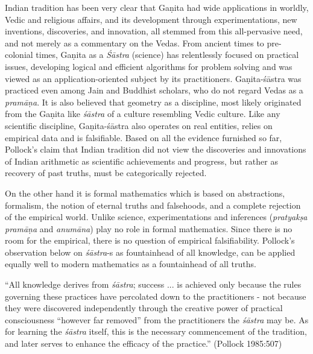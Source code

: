 Indian tradition has been very clear that Gaṇita had wide applications in worldly, Vedic and religious affairs, and its development through experimentations, new inventions, discoveries, and innovation, all stemmed from this all-pervasive need, and not merely as a commentary on the Vedas. From ancient times to pre-colonial times, Gaṇita as a {\sl Śāstra} (science) has relentlessly focused on practical issues, developing logical and efficient algorithms for problem solving and was viewed as an application-oriented subject by its practitioners. Gaṇita-śāstra was practiced even among Jain and Buddhist scholars, who do not regard Vedas as a {\sl pramāṇa}. It is also believed that geometry as a discipline, most likely originated from the Gaṇita like {\sl śāstra} of a culture resembling Vedic culture. Like any scientific discipline, Gaṇita-śāstra also operates on real entities, relies on empirical data and is falsifiable. Based on all the evidence furnished so far, Pollock’s claim that Indian tradition did not view the discoveries and innovations of Indian arithmetic as scientific achievements and progress, but rather as recovery of past truths, must be categorically rejected.

On the other hand it is formal mathematics which is based on abstractions, formalism, the notion of eternal truths and falsehoods, and a complete rejection of the empirical world. Unlike science, experimentations and inferences ({\sl pratyakṣa pramāṇa} and {\sl anumāna}) play no role in formal mathematics. Since there is no room for the empirical, there is no question of empirical falsifiability. Pollock’s observation below on {\sl śāstra}-s as fountainhead of all knowledge, can be applied equally well to modern mathematics as a fountainhead of all truths.
\begin{myquote}
``All knowledge derives from {\sl śāstra}; success ... is achieved only because the rules governing these practices have percolated down to the practitioners - not because they were discovered independently through the creative power of practical consciousness ``however far removed'' from the practitioners the {\sl śāstra} may be. As for learning the {\sl śāstra} itself, this is the necessary commencement of the tradition, and later serves to enhance the efficacy of the practice.'' (Pollock 1985:507)
\end{myquote}

